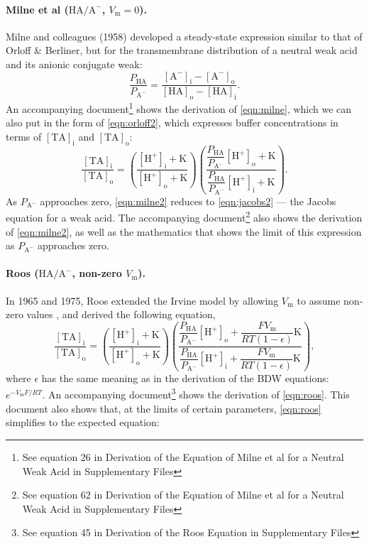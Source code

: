 \documentclass[fleqn,10pt]{physiome}
\begin{document}
\paragraph{Milne et al ($\mathrm{HA}/\mathrm{A^-}$, $V_\mathrm{m}=0$).}

Milne and colleagues (1958) developed a steady-state expression similar to that of Orloff \& Berliner, but for the transmembrane distribution of a neutral weak acid and its anionic conjugate weak:
\begin{equation}
\dfrac{P_\mathrm{HA}}{P_\mathrm{A^-}}=\dfrac{\mathrm{[A^-]_i}-\mathrm{[A^-]_o}}{\mathrm{[HA]_o}-\mathrm{[HA]_i}}.
\label{eqn:milne}
\end{equation}
An accompanying document\footnote{See equation 26 in Derivation of the Equation of Milne et al for a Neutral Weak Acid in Supplementary Files} shows the derivation of \autoref{eqn:milne}, which we can also put in the form of \autoref{eqn:orloff2}, which expresses buffer concentrations in terms of $\mathrm{[TA]_i}$ and $\mathrm{[TA]_o}$:
\begin{equation}
\dfrac{\mathrm{[TA]_i}}{\mathrm{[TA]_o}}=\left(\dfrac{\mathrm{[H^+]_i}+\mathrm{K}}{\mathrm{[H^+]_o}+\mathrm{K}}\right)\left( \dfrac{\dfrac{P_\mathrm{HA}}{P_\mathrm{A^-}}\mathrm{[H^+]_o}+\mathrm{K}}{\dfrac{P_\mathrm{HA}}{P_\mathrm{A^-}}\mathrm{[H^+]_i}+\mathrm{K}}\right).
\label{eqn:milne2}
\end{equation}
As $P_\mathrm{A^-}$ approaches zero, \autoref{eqn:milne2} reduces to \autoref{eqn:jacobs2} --- the Jacobs equation for a weak acid. The accompanying document\footnote{See equation 62 in Derivation of the Equation of Milne et al for a Neutral Weak Acid in Supplementary Files} also shows the derivation of \autoref{eqn:milne2}, as well as the mathematics that shows the limit of this expression as $P_\mathrm{A^-}$ approaches zero.

\paragraph{Roos ($\mathrm{HA}/\mathrm{A^-}$, non-zero $V_\mathrm{m}$).}

In 1965 and 1975, Roos extended the Irvine model by allowing $V_\mathrm{m}$ to assume non-zero values \citep{roos1965intracellular,roos1975intracellular}, and derived the following equation,
\begin{equation}
\dfrac{\mathrm{[TA]_i}}{\mathrm{[TA]_o}}=\left(\dfrac{\mathrm{[H^+]_i}+\mathrm{K}}{\mathrm{[H^+]_o}+\mathrm{K}}\right)\left( \dfrac{\dfrac{P_\mathrm{HA}}{P_\mathrm{A^-}}\mathrm{[H^+]_o}+\dfrac{FV_\mathrm{m}}{RT(1-\epsilon)}\mathrm{K}}{\dfrac{P_\mathrm{HA}}{P_\mathrm{A^-}}\mathrm{[H^+]_i}+\dfrac{FV_\mathrm{m}}{RT(1-\epsilon)}\mathrm{K}}\right),
\label{eqn:roos}
\end{equation}
where $\epsilon$ has the same meaning as in the derivation of the BDW equations: $e^{-V_\mathrm{m}F/RT}$. An accompanying document\footnote{See equation 45 in Derivation of the Roos Equation in Supplementary Files} shows the derivation of \autoref{eqn:roos}. This document also shows that, at the limits of certain parameters, \autoref{eqn:roos} simplifies to the expected equation:
\end{document}
